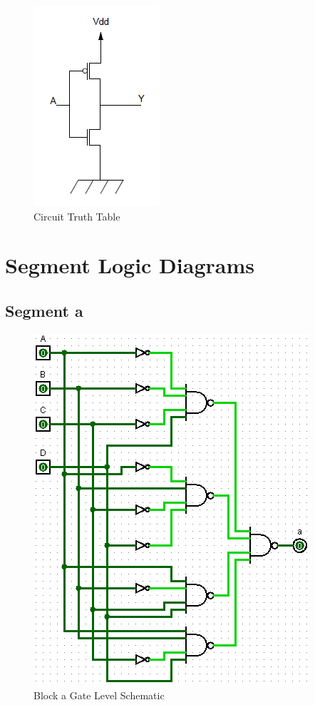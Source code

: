\documentclass[12pt]{article}
\begin{document}
\begin{figure}[h]
	\centering
	\includegraphics[scale=.5]{NOT_Trans.png}
	\caption{Circuit Truth Table}
	\label{fig:not}
\end{figure}



\newpage
\appendix
\section{Segment Logic Diagrams}
\label{app:segmentLogic}
\subsection{Segment a}

\begin{figure}[H]
	\centering
	\label{fig:aBlockGates}
	\includegraphics[width=0.5\linewidth, keepaspectratio]{a_logicCkt}
	\caption{Block a Gate Level Schematic}
\end{figure}
\end{document}
